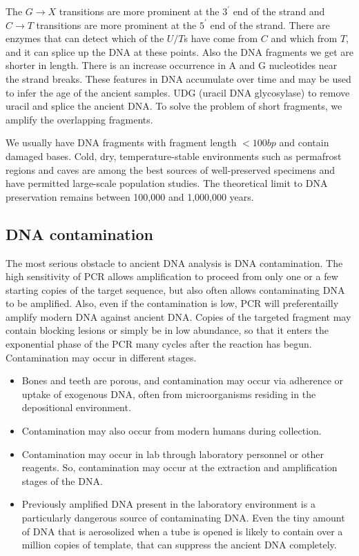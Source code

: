 \documentclass[]{article}
\begin{document}
The \(G \rightarrow X\) transitions are more prominent at the \(3^{'}\)
end of the strand and \(C \rightarrow T\) transitions are more prominent
at the \(5^{'}\) end of the strand. There are enzymes that can detect
which of the \(U/T\)s have come from \(C\) and which from \(T\), and it
can splice up the DNA at these points. Also the DNA fragments we get are
shorter in length. There is an increase occurrence in A and G
nucleotides near the strand breaks. These features in DNA accumulate
over time and may be used to infer the age of the ancient samples. UDG
(uracil DNA glycosylase) to remove uracil and splice the ancient DNA. To
solve the problem of short fragments, we amplify the overlapping
fragments.

We usually have DNA fragments with fragment length \(<100 bp\) and
contain damaged bases. Cold, dry, temperature-stable environments such
as permafrost regions and caves are among the best sources of
well-preserved specimens and have permitted large-scale population
studies. The theoretical limit to DNA preservation remains between
100,000 and 1,000,000 years.

\subsection{DNA contamination}\label{dna-contamination}

The most serious obstacle to ancient DNA analysis is DNA contamination.
The high sensitivity of PCR allows amplification to proceed from only
one or a few starting copies of the target sequence, but also often
allows contaminating DNA to be amplified. Also, even if the
contamination is low, PCR will preferentailly amplify modern DNA against
ancient DNA. Copies of the targeted fragment may contain blocking
lesions or simply be in low abundance, so that it enters the exponential
phase of the PCR many cycles after the reaction has begun. Contamination
may occur in different stages.

\begin{itemize}
\item  Bones and teeth are porous, and contamination may occur via adherence or uptake of exogenous DNA, often from microorganisms residing in the depositional environment. 
\item Contamination may also occur from modern humans during collection.
\item Contamination may occur in lab through laboratory personnel or other reagents. So, contamination may occur at the extraction and amplification stages of the DNA.
\item  Previously amplified DNA present in the laboratory environment is a particularly dangerous source of contaminating DNA. Even the tiny amount of DNA that is aerosolized when a tube is opened is likely to contain over a million copies of template, that can suppress the ancient DNA completely.
\end{itemize}
\end{document}
